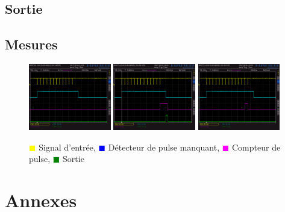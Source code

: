 \documentclass[french]{layout/Report}
\begin{document}
\subsection{Sortie}

\subsection{Mesures}

\begin{figure}[h]
\centering
\includegraphics[width=0.32\textwidth]{../measurements/SCR06}
\includegraphics[width=0.32\textwidth]{../measurements/SCR07}
\includegraphics[width=0.32\textwidth]{../measurements/SCR08}
\caption{
\textcolor{yellow}{$\blacksquare$} Signal d'entrée,
\textcolor{blue}{$\blacksquare$} Détecteur de pulse manquant,
\textcolor{magenta}{$\blacksquare$} Compteur de pulse,
\textcolor{green}{$\blacksquare$} Sortie
}
\end{figure}

\section{Annexes}
\end{document}
